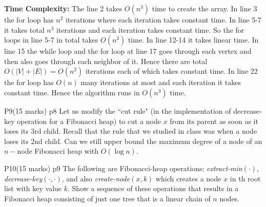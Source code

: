 \documentclass[a4paper, 11pt]{article}
\begin{document}
{\begin{algorithm}[H]
{{}
}
\caption{$(A,s,W)$}
\end{algorithm}\parinf

\textbf{Time Complexity:} The line 2 takes $O(n^3)$ time to create the array. In line 3 the for loop has $n^2$ iterations where each iteration takes constant time. In line 5-7 it takes total $n^3$ iterations and each iteration takes constant time. So the for loops in line 5-7 in total takes $O(n^3)$ time. In line 12-14 it takes linear time. In line 15 the while loop and the for loop at line 17 goes through each vertex and then also goes through each neighbor of it. Hence there are total $O(|V|+|E|)=O(n^2)$ iterations each of which takes constant time. In line 22 the for loop has $O(n)$ many iterations at most and each iteration it takes constant time. Hence the algorithm runs in $O(n^3)$ time. 
}



\begin{problem}{%
	P9\hfill  (15 marks)
}{p8%
}
Let us modify the ``cut rule" (in the implementation of decrease-key operation for a Fibonacci heap) to cut a node $x$ from its parent as soon as it loses its 3rd child. Recall that the rule that we studied in class was when a node loses its 2nd child. Can we still upper bound the maximum degree of a node of an $n-$node Fibonacci heap with $O(\log n)$.
\end{problem}
\solve{
}



\begin{problem}{%
	P10\hfill  (15 marks)
}{p9%
}
The following are Fibonacci-heap operations: \textit{extract-min}$(\cdot)$, \textit{decrease-key}$(\cdot,\cdot)$, and also \textit{create-node}$(x,k)$ which creates a node $x$ in th root list with key value $k$. Show a sequence of these operations that results in a Fibonacci heap consisting of just one tree that is a linear chain of $n$ nodes.
\end{problem}
\solve{
}
\end{document}
